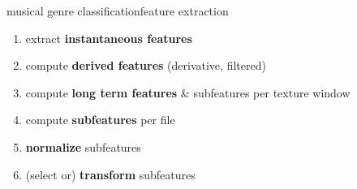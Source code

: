        \begin{frame}{musical genre classification}{feature extraction}
            \begin{enumerate}
                \item	extract \textbf{instantaneous features}
                \smallskip
                \item<2->	compute \textbf{derived features} (derivative, filtered)
                \smallskip
                \item<3->	compute \textbf{long term features} \& subfeatures per texture window
                \smallskip	
                \item<4->	compute \textbf{subfeatures} per file
                \smallskip
                \item<5->   \textbf{normalize} subfeatures
                \smallskip
                \item<6->   (select or) \textbf{transform} subfeatures

\end{enumerate}
\end{frame}
